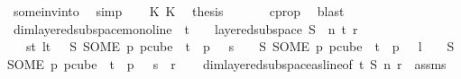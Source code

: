 \begin{isabellebody}
\ some{\isacharunderscore}{\kern0pt}inv{\isacharunderscore}{\kern0pt}into\ \isamarkupfalse%
\ simp\isanewline
\isanewline
\ \ \isamarkupfalse%
\ K{}\ K{}\ \isamarkupfalse%
\ {\isacharquery}{\kern0pt}thesis\ \isanewline
\ \ \ \ \isamarkupfalse%
\ c{}{\isacharunderscore}{\kern0pt}prop\ \isamarkupfalse%
\ blast\isanewline
{}\isamarkupfalse%
%
\endisatagproof
{\isafoldproof}%
%
\isadelimproof
\isanewline
%
\endisadelimproof
\isanewline
{}\isamarkupfalse%
\ dim{}{\isacharunderscore}{\kern0pt}layered{\isacharunderscore}{\kern0pt}subspace{\isacharunderscore}{\kern0pt}mono{\isacharunderscore}{\kern0pt}line{\isacharcolon}{\kern0pt}\ \ {\isachardoublequoteopen}t\ {\isachargreater}{\kern0pt}\ {}{\isachardoublequoteclose}\ \ {\isachardoublequoteopen}layered{\isacharunderscore}{\kern0pt}subspace\ S\ {}\ n\ t\ r\ {\isasymchi}{\isachardoublequoteclose}\isanewline
\ \ \ {\isachardoublequoteopen}{\isasymforall}s{\isacharless}{\kern0pt}t{\isachardot}{\kern0pt}\ {\isasymforall}l{\isacharless}{\kern0pt}t{\isachardot}{\kern0pt}\ \ {\isasymchi}\ {\isacharparenleft}{\kern0pt}S\ {\isacharparenleft}{\kern0pt}SOME\ p{\isachardot}{\kern0pt}\ p{\isasymin}cube\ {}\ {\isacharparenleft}{\kern0pt}t{\isacharplus}{\kern0pt}{}{\isacharparenright}{\kern0pt}\ {\isasymand}\ p\ {}\ {\isacharequal}{\kern0pt}\ s{\isacharparenright}{\kern0pt}{\isacharparenright}{\kern0pt}\ {\isacharequal}{\kern0pt}\ \ {\isasymchi}\ {\isacharparenleft}{\kern0pt}S\ {\isacharparenleft}{\kern0pt}SOME\ p{\isachardot}{\kern0pt}\ p{\isasymin}cube\ {}\ {\isacharparenleft}{\kern0pt}t{\isacharplus}{\kern0pt}{}{\isacharparenright}{\kern0pt}\ {\isasymand}\ p\ {}\ {\isacharequal}{\kern0pt}\ l{\isacharparenright}{\kern0pt}{\isacharparenright}{\kern0pt}\ {\isasymand}\ \ {\isasymchi}\ {\isacharparenleft}{\kern0pt}S\ {\isacharparenleft}{\kern0pt}SOME\ p{\isachardot}{\kern0pt}\ p{\isasymin}cube\ {}\ {\isacharparenleft}{\kern0pt}t{\isacharplus}{\kern0pt}{}{\isacharparenright}{\kern0pt}\ {\isasymand}\ p\ {}\ {\isacharequal}{\kern0pt}\ s{\isacharparenright}{\kern0pt}{\isacharparenright}{\kern0pt}\ {\isacharless}{\kern0pt}\ r{\isachardoublequoteclose}\isanewline
%
\isadelimproof
\ \ %
\endisadelimproof
%
\isatagproof
{}\isamarkupfalse%
\ dim{}{\isacharunderscore}{\kern0pt}layered{\isacharunderscore}{\kern0pt}subspace{\isacharunderscore}{\kern0pt}as{\isacharunderscore}{\kern0pt}line{\isacharbrackleft}{\kern0pt}of\ t\ S\ n\ r\ {\isasymchi}{\isacharbrackright}{\kern0pt}\ assms\ \isamarkupfalse%

\end{isabellebody}

